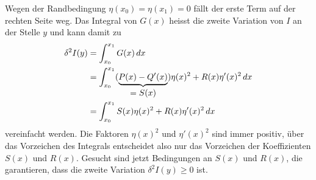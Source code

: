 Wegen der Randbedingung $\eta(x_0)=\eta(x_1)=0$ fällt der
erste Term auf der rechten Seite weg.
Das Integral von $G(x)$ heisst die zweite Variation von $I$ an der
Stelle $y$ und kann damit zu
\begin{align}
\delta^2 I(y)
&=
\int_{x_0}^{x_1} G(x)\,dx
\notag
\\
&=
\int_{x_0}^{x_1}
(\underbrace{P(x)-Q'(x)}_{\displaystyle = S(x)}) \eta(x)^2
+
R(x)\eta'(x)^2
\,dx
\notag
\\
&=
\int_{x_0}^{x_1}
S(x)\eta(x)^2 + R(x)\eta'(x)^2
\,dx
\label{buch:variation2:zweitevariation:eqn:SRintegral}
\end{align}
vereinfacht werden.
Die Faktoren $\eta(x)^2$ und $\eta'(x)^2$ sind immer positiv,
über das Vorzeichen des Integrals entscheidet also nur das Vorzeichen
der Koeffizienten $S(x)$ und $R(x)$.
Gesucht sind jetzt Bedingungen an $S(x)$ und $R(x)$, die garantieren,
dass die zweite Variation $\delta^2 I(y)\ge 0$ ist.



